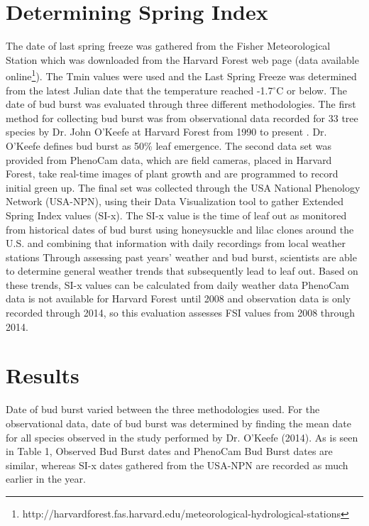 \documentclass{article}\usepackage[]{graphicx}\usepackage[]{color}
\begin{document}
\section*{Determining Spring Index}
The date of last spring freeze was gathered from the Fisher Meteorological Station which was downloaded from the Harvard Forest web page (data available online\footnote{http://harvardforest.fas.harvard.edu/meteorological-hydrological-stations}). The Tmin values were used and the Last Spring Freeze was  determined from the latest Julian date that the temperature reached -1.7$^{\circ}$C or below. The date of bud burst was evaluated through three different methodologies. The first method for collecting bud burst was from observational data recorded for 33 tree species by Dr. John O'Keefe at Harvard Forest from 1990 to present \citep{OKeefe2014}. 
Dr. O'Keefe defines bud burst as 50\% leaf emergence. The second data set was provided from PhenoCam data, which are field cameras, placed in Harvard Forest, take real-time images of plant growth and are programmed to record initial green up. The final set was collected through the USA National Phenology Network (USA-NPN), using their Data Visualization tool to gather Extended Spring Index values (SI-x). The SI-x value is the time of leaf out as monitored from historical dates of bud burst using honeysuckle and lilac clones around the U.S. and combining that information with daily recordings from local weather stations %
Through assessing past years' weather and bud burst, scientists are able to determine general weather trends that subsequently lead to leaf out. Based on these trends, SI-x values can be calculated from daily weather data %
\newline
PhenoCam data is not available for Harvard Forest until 2008 and observation data is only recorded through 2014, so this evaluation assesses FSI values from 2008 through 2014. 
\section*{Results}
Date of bud burst varied between the three methodologies used. For the observational data, date of bud burst was determined by finding the mean date for all species observed in the study performed by Dr. O'Keefe (2014). %
As is seen in Table 1, Observed Bud Burst dates and PhenoCam Bud Burst dates are similar, whereas SI-x dates gathered from the USA-NPN are recorded as much earlier in the year.
\end{document}
